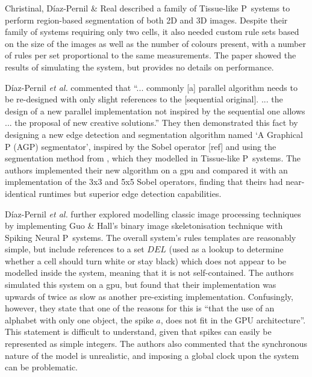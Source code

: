 Christinal, Díaz-Pernil \& Real \cite{Christinal2011} described a family of Tissue-like P~systems to perform region-based segmentation of both 2D and 3D images.  Despite their family of systems requiring only two cells, it also needed custom rule sets based on the size of the images as well as the number of colours present, with a number of rules per set proportional to the same measurements.  The paper showed the results of simulating the system, but provides no details on performance.

Díaz-Pernil \textit{et al.} \cite{Diaz-Pernil2013} commented that ``... commonly [a] parallel algorithm needs to be re-designed with only slight references to the [sequential original].  ... the design of a new parallel implementation not inspired by the sequential one allows ... the proposal of new creative solutions.''  They then demonstrated this fact by designing a new edge detection and segmentation algorithm named `A Graphical P (AGP) segmentator', inspired by the Sobel operator [ref] and using the segmentation method from \cite{Christinal2011}, which they modelled in Tissue-like P~systems.  The authors implemented their new algorithm on a \gls{gpu} and compared it with an implementation of the 3x3 and 5x5 Sobel operators, finding that theirs had near-identical runtimes but superior edge detection capabilities.

Díaz-Pernil \textit{et al.} \cite{Diaz-Pernil2013a} further explored modelling classic image processing techniques by implementing Guo \& Hall's binary image skeletonisation technique \cite{Guo1989} with Spiking Neural P~systems.  The overall system's rules templates are reasonably simple, but include references to a set \(DEL\) (used as a lookup to determine whether a cell should turn white or stay black) which does not appear to be modelled inside the system, meaning that it is not self-contained.  The authors simulated this system on a \gls{gpu}, but found that their implementation was upwards of twice as slow as another pre-existing implementation.  Confusingly, however, they state that one of the reasons for this is ``that the use of an alphabet with only one object, the spike \(a\), does not fit in the GPU architecture''.  This statement is difficult to understand, given that spikes can easily be represented as simple integers.  The authors also commented that the synchronous nature of the model is unrealistic, and imposing a global clock upon the system can be problematic.

